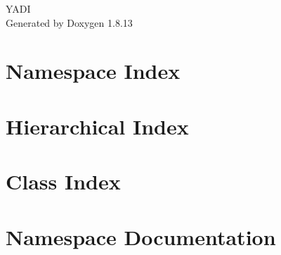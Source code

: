 \documentclass[twoside]{book}
\newcommand{\+}{\discretionary{\mbox{\scriptsize$\hookleftarrow$}}{}{}}
\newcommand{\clearemptydoublepage}{%
  \newpage{\pagestyle{empty}\cleardoublepage}%
}
\begin{document}
\hypersetup{pageanchor=false,
             bookmarksnumbered=true,
             pdfencoding=unicode
            }
\begin{titlepage}
\vspace*{7cm}
\begin{center}%
{\Large Y\+A\+DI }\\
\vspace*{1cm}
{\large Generated by Doxygen 1.8.13}\\
\end{center}
\end{titlepage}
\clearemptydoublepage
{}
\tableofcontents
\clearemptydoublepage
{}
\hypersetup{pageanchor=true}

\chapter{Namespace Index}

\chapter{Hierarchical Index}

\chapter{Class Index}

\chapter{Namespace Documentation}

\end{document}
